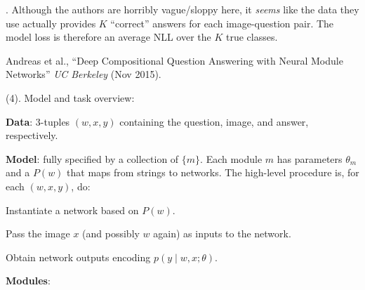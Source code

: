 \documentclass[11pt]{article}
\begin{document}
. Although the authors are horribly vague/sloppy here, it \textit{seems} like the data they use actually provides $K$ ``correct'' answers for each image-question pair. The model loss is therefore an average NLL over the $K$ true classes. 



\vspace{-1em}
{\footnotesize Andreas et al., ``Deep Compositional Question Answering with Neural Module Networks'' \textit{UC Berkeley} (Nov 2015).}


 (4). Model and task overview:
\begin{compactitem}
	\item \textbf{Data}: 3-tuples $(w, x, y)$ containing the question, image, and answer, respectively.
	
	\item \textbf{Model}: fully specified by a collection of  $\{m\}$. Each module $m$ has parameters $\theta_m$ and a  $P(w)$ that maps from strings to networks. The high-level procedure is, for each $(w, x, y)$, do:
	\begin{compactenum}
		\item Instantiate a network based on $P(w)$.
		\item Pass the image $x$ (and possibly $w$ again) as inputs to the network. 
		\item Obtain network outputs encoding $p(y \mid w, x; \theta)$. 
	\end{compactenum}
	
	\item \textbf{Modules}:
\end{compactitem}
\end{document}
